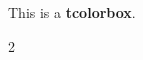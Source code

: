 \documentclass[a4paper, 10pt]{article}
\begin{document}
	\begin{tcolorbox}[colback=gray!5!white,
		rounded corners=northwest ]
		This is a \textbf{tcolorbox}.
	\end{tcolorbox}
	\begin{multicols}{2}
		\lipsum[1-5]
	\end{multicols}
	
	\lipsum[1-20]
\end{document}
